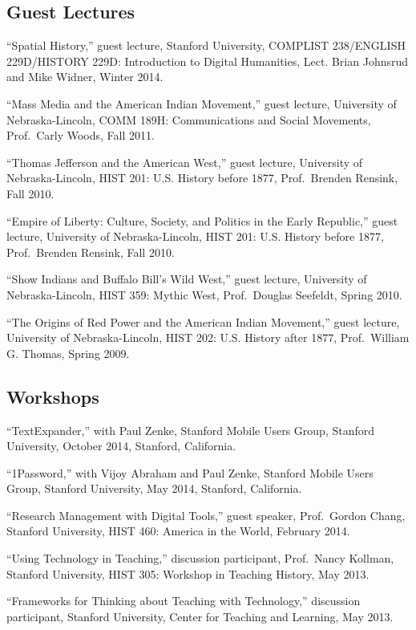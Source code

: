 \subsection{Guest Lectures}\label{guest-lectures}

``Spatial History,'' guest lecture, Stanford University, COMPLIST
238/ENGLISH 229D/HISTORY 229D: Introduction to Digital Humanities, Lect.
Brian Johnsrud and Mike Widner, Winter 2014.

``Mass Media and the American Indian Movement,'' guest lecture,
University of Nebraska-Lincoln, COMM 189H: Communications and Social
Movements, Prof.~Carly Woods, Fall 2011.

``Thomas Jefferson and the American West,'' guest lecture, University of
Nebraska-Lincoln, HIST 201: U.S. History before 1877, Prof.~Brenden
Rensink, Fall 2010.

``Empire of Liberty: Culture, Society, and Politics in the Early
Republic,'' guest lecture, University of Nebraska-Lincoln, HIST 201:
U.S. History before 1877, Prof.~Brenden Rensink, Fall 2010.

``Show Indians and Buffalo Bill's Wild West,'' guest lecture, University
of Nebraska-Lincoln, HIST 359: Mythic West, Prof.~Douglas Seefeldt,
Spring 2010.

``The Origins of Red Power and the American Indian Movement,'' guest
lecture, University of Nebraska-Lincoln, HIST 202: U.S. History after
1877, Prof.~William G. Thomas, Spring 2009.

\subsection{Workshops}\label{workshops}

``TextExpander,'' with Paul Zenke, Stanford Mobile Users Group, Stanford
University, October 2014, Stanford, California.

``1Password,'' with Vijoy Abraham and Paul Zenke, Stanford Mobile Users
Group, Stanford University, May 2014, Stanford, California.

``Research Management with Digital Tools,'' guest speaker, Prof.~Gordon
Chang, Stanford University, HIST 460: America in the World, February
2014.

``Using Technology in Teaching,'' discussion participant, Prof.~Nancy
Kollman, Stanford University, HIST 305: Workshop in Teaching History,
May 2013.

``Frameworks for Thinking about Teaching with Technology,'' discussion
participant, Stanford University, Center for Teaching and Learning, May
2013.

